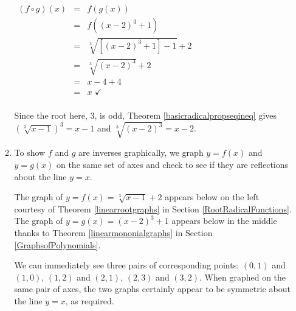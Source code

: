 \documentclass{ximera}
\begin{document}
\begin{example}
\begin{enumerate}
\begin{enumerate}
\begin{multicols}{2}
$\begin{array}{rcl}

(f \circ g)(x) & = & f(g(x))  \\
                   & = & f((x-2)^3+1)  \\
                   & = & \sqrt[3]{[(x-2)^3+1] -1}+2 \\
                   & = & \sqrt[3]{(x-2)^3} +2\\
                   & = & x-4+4  \\ 
                   & = & x \, \, \checkmark \\
\end{array}$

\end{multicols}

Since the root here, $3$, is odd, Theorem \ref{basicradicalpropseqineq} gives $(\sqrt[3]{x-1})^3 = x-1$ and $\sqrt[3]{(x-2)^3} = x-2$.

\item To show $f$ and $g$ are inverses graphically, we graph $y = f(x)$ and $y = g(x)$ on the same set of axes and check to see if they are reflections about the line $y=x$.  

\smallskip

The graph of  $y =  f(x) = \sqrt[3]{x-1} + 2$ appears below on the left courtesy of Theorem \ref{linearrootgraphs} in Section \ref{RootRadicalFunctions}.  The graph of  $y = g(x) = (x-2)^3+1$ appears below in the middle thanks to Theorem \ref{linearmononialgraphs} in Section \ref{GraphsofPolynomials}.  

\smallskip

We can immediately see three pairs of  corresponding points: $(0,1)$ and $(1,0)$, $(1,2)$ and $(2,1)$, $(2,3)$ and $(3,2)$.  When graphed on the same pair of axes, the two graphs certainly appear to be symmetric about the line $y=x$, as required.

\begin{multicols}{3}

% 



\end{multicols}
\end{enumerate}
\end{enumerate}
\end{example}
\end{document}
